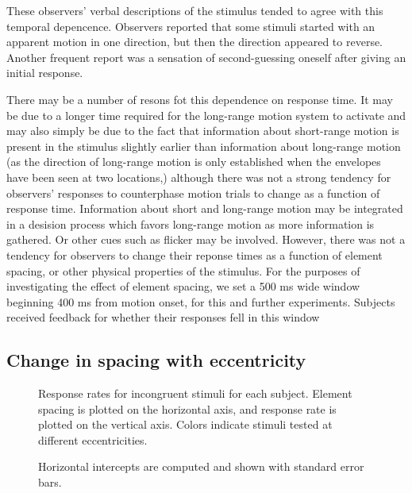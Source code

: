 \documentclass[english,jou]{article}
\begin{document}
These observers' verbal descriptions of the stimulus tended to agree
with this temporal depencence. Observers reported that some stimuli
started with an apparent motion in one direction, but then the direction
appeared to reverse. Another frequent report was a sensation of second-guessing
oneself after giving an initial response.  

There may be a number of resons fot this dependence on response time.
It may be due to a longer time required for the long-range motion
system to activate  and may also simply be due to the fact that information
about short-range motion is present in the stimulus slightly earlier
than information about long-range motion (as the direction of long-range
motion is only established when the envelopes have been seen at two
locations,) although there was not a strong tendency for observers'
responses to counterphase motion trials to change as a function of
response time. Information about short and long-range motion may
be integrated in a desision process which favors long-range motion
as more information is gathered. Or other cues such as flicker may
be involved. However, there was not a tendency for observers to change
their reponse times as a function of element spacing, or other physical
properties of the stimulus.  For the purposes of investigating the
effect of element spacing, we set a 500 ms wide window beginning 400
ms from motion onset, for this and further experiments. Subjects received
feedback for whether their responses fell in this window




\subsection{Change in spacing with eccentricity\label{sec:eccentricity}}





\begin{figure}
\caption{\label{fig:eccentricity-psychfuns}Response rates for incongruent
stimuli for each subject. Element spacing is plotted on the horizontal
axis, and response rate is plotted on the vertical axis. Colors indicate
stimuli tested at different eccentricities.}
\end{figure}


\begin{figure}
\caption{\label{fig:eccentricity-pse}Horizontal intercepts are computed and
shown with standard error bars.}
\end{figure}
\end{document}

